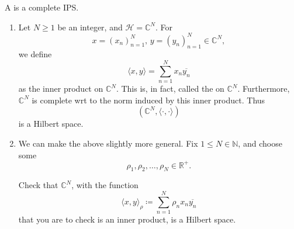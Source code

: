 \documentclass[notoc,notitlepage]{tufte-book}
\begin{document}
\begin{defn}\label{defn:hilbert_space}
  A  is a complete IPS.
\end{defn}

\begin{eg}
  \begin{enumerate}
    \item Let $N \geq 1$ be an integer, and $\mathcal{H} = \mathbb{C}^N$.
      For
      \begin{equation*}
        x = (x_n)_{n=1}^{N},\, y = (y_n)_{n=1}^{N} \in \mathbb{C}^N,
      \end{equation*}
      we define
      \begin{equation*}
        \langle x, y \rangle = \sum_{n=1}^{N} x_n \overline{y_n}
      \end{equation*}
      as the inner product on $\mathbb{C}^N$.
      This is, in fact,
      called the  on $\mathbb{C}^N$.
      Furthermore, $\mathbb{C}^N$ is complete
      wrt to the norm induced by this inner product.
      Thus
      \begin{equation*}
        (\mathbb{C}^N, \langle \cdot, \cdot \rangle)
      \end{equation*}
      is a Hilbert space.

    \item We can make the above slightly more general.
      Fix $1 \leq N \in \mathbb{N}$, and choose some
      \begin{equation*}
        \rho_1, \rho_2, \ldots, \rho_N \in \mathbb{R}^+.
      \end{equation*}

      \begin{ex}
        Check that $\mathbb{C}^N$, with the function
        \begin{equation*}
          \langle x, y \rangle_{\rho} \coloneqq \sum_{n=1}^{N} \rho_n x_n \overline{y_n}
        \end{equation*}
        that you are to check is an inner product, is a Hilbert space.
      \end{ex}


\end{enumerate}
\end{eg}
\end{document}
